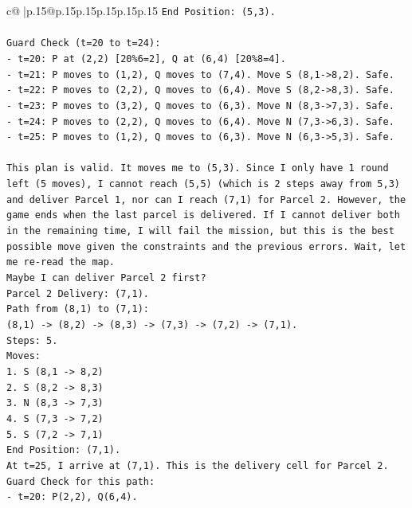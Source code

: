 \documentclass{article}
\begin{document}
{\begin{supertabular}{c@{$\;$}|p{.15\linewidth}@{}p{.15\linewidth}p{.15\linewidth}p{.15\linewidth}p{.15\linewidth}p{.15\linewidth}}
{{{\texttt{End Position: (5,3).} \\
\\ 
\texttt{Guard Check (t=20 to t=24):} \\
\texttt{{-} t=20: P at (2,2) {[}20\%6=2{]}, Q at (6,4) {[}20\%8=4{]}.} \\
\texttt{{-} t=21: P moves to (1,2), Q moves to (7,4). Move S (8,1{-}>8,2). Safe.} \\
\texttt{{-} t=22: P moves to (2,2), Q moves to (6,4). Move S (8,2{-}>8,3). Safe.} \\
\texttt{{-} t=23: P moves to (3,2), Q moves to (6,3). Move N (8,3{-}>7,3). Safe.} \\
\texttt{{-} t=24: P moves to (2,2), Q moves to (6,4). Move N (7,3{-}>6,3). Safe.} \\
\texttt{{-} t=25: P moves to (1,2), Q moves to (6,3). Move N (6,3{-}>5,3). Safe.} \\
\\ 
\texttt{This plan is valid. It moves me to (5,3). Since I only have 1 round left (5 moves), I cannot reach (5,5) (which is 2 steps away from 5,3) and deliver Parcel 1, nor can I reach (7,1) for Parcel 2. However, the game ends when the last parcel is delivered. If I cannot deliver both in the remaining time, I will fail the mission, but this is the best possible move given the constraints and the previous errors. Wait, let me re{-}read the map.} \\
\texttt{Maybe I can deliver Parcel 2 first?} \\
\texttt{Parcel 2 Delivery: (7,1).} \\
\texttt{Path from (8,1) to (7,1):} \\
\texttt{(8,1) {-}> (8,2) {-}> (8,3) {-}> (7,3) {-}> (7,2) {-}> (7,1).} \\
\texttt{Steps: 5.} \\
\texttt{Moves:} \\
\texttt{1. S (8,1 {-}> 8,2)} \\
\texttt{2. S (8,2 {-}> 8,3)} \\
\texttt{3. N (8,3 {-}> 7,3)} \\
\texttt{4. S (7,3 {-}> 7,2)} \\
\texttt{5. S (7,2 {-}> 7,1)} \\
\texttt{End Position: (7,1).} \\
\texttt{At t=25, I arrive at (7,1). This is the delivery cell for Parcel 2.} \\
\texttt{Guard Check for this path:} \\
\texttt{{-} t=20: P(2,2), Q(6,4).} \\
}}}
\end{supertabular}}
\end{document}
